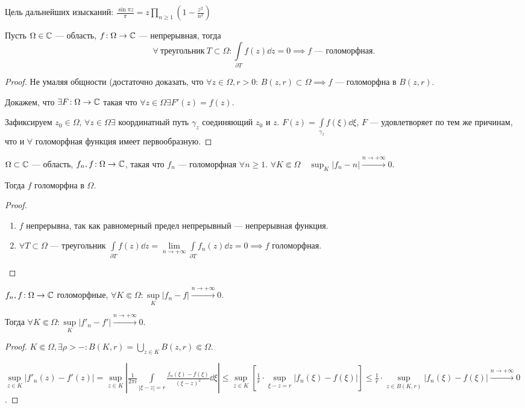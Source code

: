 Цель дальнейших изысканий: $\frac{\sin \pi z}{\pi} = z \prod\limits_{n \ge  1} \left( 1 - \frac{z^2}{n^2}\right) $ 
\begin{theorem}
    Пусть $\Omega \in \mathbb{C}$ --- область,  $f\!: \Omega \to \mathbb{C}$ --- непрерывная, тогда  \[
        \forall\ \text{треугольник}\ T \subset \Omega\!:\int\limits_{\partial T} f(z) \dd{z} = 0 \implies f\text{ --- голоморфная}
    .\] 
\end{theorem}
\begin{proof}
    Не умаляя общности (достаточно доказать, что $\forall z \in \Omega, r > 0$:  $B(z, r) \subset \Omega \implies f$ --- голоморфна в $B(z, r)$.

    Докажем, что  $\exists F\!: \Omega \to \mathbb{C}$ такая что  $\forall z \in \Omega \exists F'(z) = f(z)$. 

    Зафиксируем  $z_0 \in \Omega$, $\forall z \in \Omega \exists$ координатный путь  $\gamma_z$ соединяющий  $z_0$ и $z$.  $F(z) = \int\limits_{\gamma_z} f(\xi) \dd{\xi}$, $F$ --- удовлетворяет по тем же причинам, что и $\forall$ голоморфная функция имеет первообразную.  
\end{proof}
\begin{consequence}
    $\Omega \subset \mathbb{C}$ --- область,  $f_n, f\!: \Omega \to \mathbb{C}$, такая что  $f_n$ --- голоморфная  $\forall n \ge 1$. $\forall K \Subset \Omega\quad \sup_{K}  \left| f_n - n \right| \xrightarrow{n \to +\infty} 0$.

    Тогда $f$ голоморфна в  $\Omega$.
\end{consequence}
\begin{proof}
    \begin{enumerate}
        \item $f$ непрерывна, так как равномерный предел непрерывный --- непрерывная функция.
        \item  $\forall T \subset \Omega$ --- треугольник  $\int\limits_{\partial T} f(z) \dd{z} = \lim\limits_{n \to +\infty} \int\limits_{\partial T}f_n(z) \dd{z} = 0 \implies f$ голоморфная.
    \end{enumerate}
\end{proof}
\begin{lemma}
    $f_n, f\!: \Omega \to \mathbb{C}$ голоморфные, $\forall K \Subset \Omega\!: \sup\limits_{K} \left| f_n - f \right| \xrightarrow{n \to +\infty} 0$.

    Тогда $\forall K \Subset \Omega\!: \sup\limits_{K} \left| f'_n - f' \right| \xrightarrow{n \to +\infty} 0$.
\end{lemma}
\begin{proof}
    $K \Subset \Omega, \exists \rho > -\!: B(K, r) = \bigcup\limits_{z \in K} B(z, r) \Subset \Omega$.

    $\sup\limits_{z \in K} \left| f'_n(z) - f'(z) \right| = \sup\limits_{z \in K} \left| \frac{1}{2 \pi i} \int\limits_{|\xi - z| = r} \frac{f_n(\xi) - f(\xi)}{(\xi - z)^2} \dd{\xi} \right| \le \sup\limits_{z \in K} \left[ \frac{1}{r} \cdot \sup\limits_{\xi - z = r} |f_n(\xi) - f(\xi)| \right] \le \frac{1}{r} \cdot  \sup\limits_{z \in B(K, r)} \left| f_n(\xi) - f(\xi) \right| \xrightarrow{n \to +\infty} 0$.
\end{proof}

